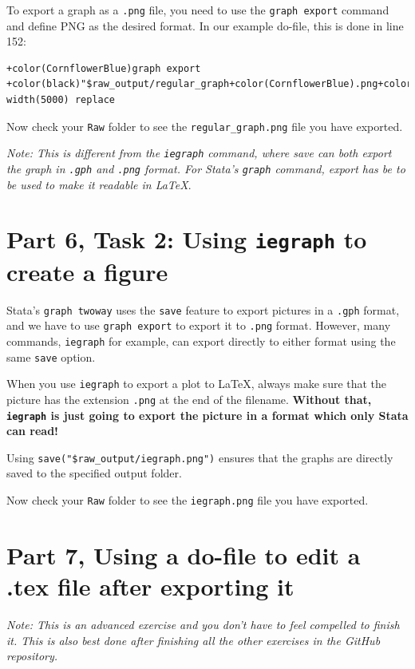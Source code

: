 \documentclass[]{article}
\begin{document}
To export a graph as a \texttt{.png} file, you need to use the \texttt{graph export} command and define PNG as the desired format. In our example do-file, this is done in line 152: 

	\begin{Verbatim}[commandchars=+\(\)]
	+color(CornflowerBlue)graph export +color(black)"$raw_output/regular_graph+color(CornflowerBlue).png+color(black)", width(5000) replace
	\end{Verbatim}

Now check your \texttt{Raw} folder to see the \texttt{regular\_graph.png} file you have exported.

\begin{center}
\textit{Note: This is different from the \texttt{iegraph} command, where save can both export the graph in \texttt{.gph} and \texttt{.png} format. For Stata's \texttt{graph} command, export has be to be used to make it readable in {\LaTeX}}.
\end{center}	
 

\section*{Part 6, Task 2: Using \texttt{iegraph} to create a figure}

Stata's \texttt{graph twoway} uses the \texttt{save} feature to export pictures in a \texttt{.gph} format, and we have to use \texttt{graph export} to export it to \texttt{.png} format. However, many commands, \texttt{iegraph} for example, can export directly to either format using the same \texttt{save} option. 

When you use \texttt{iegraph} to export a plot to {\LaTeX}, always make sure that the picture has the extension \texttt{.png} at the end of the filename. \textbf{Without that, \texttt{iegraph} is just going to export the picture in a format which only Stata can read!}

Using \verb|save("$raw_output/iegraph.png")| ensures that the graphs are directly saved to the specified output folder. 

Now check your \texttt{Raw} folder to see the \texttt{iegraph.png} file you have exported.


\section*{Part 7, Using a do-file to edit a .tex file after exporting it}
\textit{Note: This is an advanced exercise and you don't have to feel compelled to finish it. This is also best done after finishing all the other exercises in the GitHub repository.}
\end{document}
